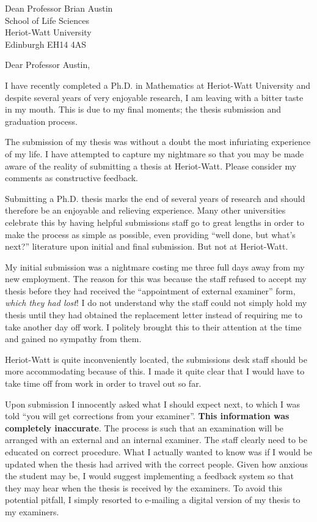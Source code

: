 \documentclass[10pt]{letter}
\begin{document}
\begin{letter}{Dean Professor Brian Austin\\
School of Life Sciences\\
Heriot-Watt University\\
Edinburgh EH14 4AS}
\opening{Dear Professor Austin,}

I have recently completed a Ph.D. in Mathematics at Heriot-Watt University and
despite several years of very enjoyable research, I am leaving with a bitter
taste in my mouth. This is due to my final moments; the thesis submission and
graduation process.

The submission of my thesis was without a doubt the most infuriating experience
of my life. I have attempted to capture my nightmare so that you may be made
aware of the reality of submitting a thesis at Heriot-Watt. Please consider my
comments as constructive feedback.

Submitting a Ph.D. thesis marks the end of several years of research and should
therefore be an enjoyable and relieving experience. Many other universities
celebrate this by having helpful submissions staff go to great lengths in order
to make the process as simple as possible, even providing ``well done, but
what's next?'' literature upon initial and final submission. But not at
Heriot-Watt.

My initial submission was a nightmare costing me three full days away from my
new employment. The reason for this was because the staff refused to accept my
thesis before they had received the ``appointment of external examiner'' form,
\textit{which they had lost}! I do not understand why the staff could not simply
hold my thesis until they had obtained the replacement letter instead of
requiring me to take another day off work. I politely brought this to their
attention at the time and gained no sympathy from them.

Heriot-Watt is quite inconveniently located, the submissions desk staff should
be more accommodating because of this. I made it quite clear that I would have
to take time off from work in order to travel out so far.

Upon submission I innocently asked what I should expect next, to which I was
told ``you will get corrections from your examiner''. \textbf{This information
  was completely inaccurate}. The process is such that an examination will be
arranged with an external and an internal examiner. The staff clearly need to be
educated on correct procedure. What I actually wanted to know was if I would be
updated when the thesis had arrived with the correct people. Given how anxious
the student may be, I would suggest implementing a feedback system so that they
may hear when the thesis is received by the examiners. To avoid this potential
pitfall, I simply resorted to e-mailing a digital version of my thesis to my
examiners.


\end{letter}
\end{document}
